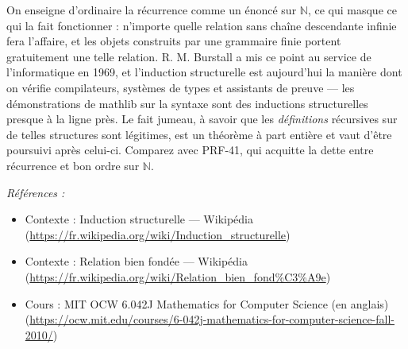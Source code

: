\documentclass[11pt]{article}
\newenvironment{refs}{\par\small\noindent\emph{Références :}\begin{itemize}\setlength\itemsep{0pt}}{\end{itemize}\normalsize}
\begin{document}
\noindent On enseigne d'ordinaire la récurrence comme un énoncé sur $\mathbb{N}$, ce qui masque
ce qui la fait fonctionner : n'importe quelle relation sans chaîne descendante infinie fera
l'affaire, et les objets construits par une grammaire finie portent gratuitement une telle
relation. R. M. Burstall a mis ce point au service de l'informatique en 1969, et l'induction
structurelle est aujourd'hui la manière dont on vérifie compilateurs, systèmes de types et
assistants de preuve --- les démonstrations de mathlib sur la syntaxe sont des inductions
structurelles presque à la ligne près. Le fait jumeau, à savoir que les \textit{définitions}
récursives sur de telles structures sont légitimes, est un théorème à part entière et vaut
d'être poursuivi après celui-ci. Comparez avec PRF-41, qui acquitte la dette entre récurrence
et bon ordre sur $\mathbb{N}$.

\begin{refs}
\item Contexte : Induction structurelle --- Wikipédia (\url{https://fr.wikipedia.org/wiki/Induction_structurelle})
\item Contexte : Relation bien fondée --- Wikipédia (\url{https://fr.wikipedia.org/wiki/Relation_bien_fond%C3%A9e})
\item Cours : MIT OCW 6.042J Mathematics for Computer Science (en anglais) (\url{https://ocw.mit.edu/courses/6-042j-mathematics-for-computer-science-fall-2010/})
\end{refs}

\bigskip
\end{document}
